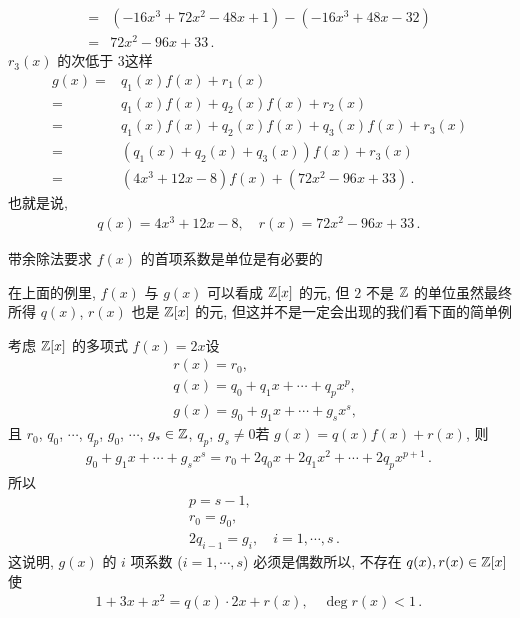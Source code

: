 \begin{example}
\begin{align*}
        = {} & (-16x^3 + 72x^2 - 48x + 1) - (-16x^3 + 48x - 32)  \\
        = {} & 72x^2 - 96x + 33 \period
    \end{align*}
    $r_3 (x)$ 的次低于 $3$\period 这样
    \begin{align*}
        g(x)
        = {} & q_1 (x) f(x) + r_1 (x)                               \\
        = {} & q_1 (x) f(x) + q_2 (x) f(x) + r_2 (x)                \\
        = {} & q_1 (x) f(x) + q_2 (x) f(x) + q_3 (x) f(x) + r_3 (x) \\
        = {} & (q_1 (x) + q_2 (x) + q_3 (x)) f(x) + r_3 (x)         \\
        = {} & (4x^3 + 12x - 8) f(x) + (72x^2 - 96x + 33) \period
    \end{align*}
    也就是说,
    \begin{align*}
        q(x) = 4x^3 + 12x - 8, \quad r(x) = 72x^2 - 96x + 33 \period
    \end{align*}
\end{example}

\begin{remark}
    带余除法要求 $f(x)$ 的首项系数是单位是有必要的\period

    在上面的例里, $f(x)$ 与 $g(x)$ 可以看成 $\mathbb{Z}[x]$ 的元, 但 $2$ 不是 $\mathbb{Z}$ 的单位\period 虽然最终所得 $q(x)$, $r(x)$ 也是 $\mathbb{Z}[x]$ 的元, 但这并不是一定会出现的\period 我们看下面的简单例\period

    考虑 $\mathbb{Z}[x]$ 的多项式 $f(x)=2x$\period 设
    \begin{align*}
         & r(x) = r_0,                            \\
         & q(x) = q_0 + q_1 x + \cdots + q_p x^p, \\
         & g(x) = g_0 + g_1 x + \cdots + g_s x^s,
    \end{align*}
    且 $r_0$, $q_0$, $\cdots$, $q_p$, $g_0$, $\cdots$, $g_s \in \mathbb{Z}$, $q_p$, $g_s \neq 0$\period 若 $g(x) = q(x)f(x) + r(x)$, 则
    \begin{align*}
        g_0 + g_1 x + \cdots + g_s x^s = r_0 + 2q_0 x + 2q_1 x^2 + \cdots + 2q_p x^{p+1} \period
    \end{align*}
    所以
    \begin{align*}
         & p = s - 1,                                 \\
         & r_0 = g_0,                                 \\
         & 2q_{i-1} = g_i, \quad i=1,\cdots,s \period
    \end{align*}
    这说明, $g(x)$ 的 $i$ 项系数 ($i=1,\cdots,s$) 必须是偶数\period 所以, 不存在 $q(x),r(x) \in \mathbb{Z}[x]$ 使
    \begin{align*}
        1 + 3x + x^2 = q(x) \cdot 2x + r(x), \quad \deg r(x) < 1 \period
    \end{align*}
\end{remark}

